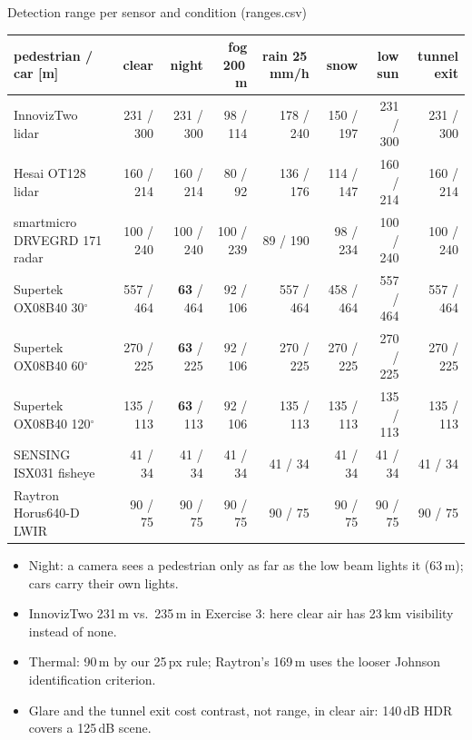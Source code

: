 \documentclass[aspectratio=169,11pt]{beamer}
\begin{document}
\begin{frame}{Detection range per sensor and condition (ranges.csv)}
  \centering\scriptsize
  \renewcommand{\arraystretch}{1.15}
  \setlength{\tabcolsep}{2.5pt}
  \begin{tabular}{@{}lrrrrrrr@{}}
    \toprule
    pedestrian / car [m] & clear & night & fog 200\,m & rain 25\,mm/h & snow & low sun & tunnel exit \\
    \midrule
    InnovizTwo lidar & 231 / 300 & 231 / 300 & 98 / 114 & 178 / 240 & 150 / 197 & 231 / 300 & 231 / 300 \\
    Hesai OT128 lidar & 160 / 214 & 160 / 214 & 80 / 92 & 136 / 176 & 114 / 147 & 160 / 214 & 160 / 214 \\
    smartmicro DRVEGRD 171 radar & 100 / 240 & 100 / 240 & 100 / 239 & 89 / 190 & 98 / 234 & 100 / 240 & 100 / 240 \\
    Supertek OX08B40 30$^\circ$ & 557 / 464 & \textbf{63} / 464 & 92 / 106 & 557 / 464 & 458 / 464 & 557 / 464 & 557 / 464 \\
    Supertek OX08B40 60$^\circ$ & 270 / 225 & \textbf{63} / 225 & 92 / 106 & 270 / 225 & 270 / 225 & 270 / 225 & 270 / 225 \\
    Supertek OX08B40 120$^\circ$ & 135 / 113 & \textbf{63} / 113 & 92 / 106 & 135 / 113 & 135 / 113 & 135 / 113 & 135 / 113 \\
    SENSING ISX031 fisheye & 41 / 34 & 41 / 34 & 41 / 34 & 41 / 34 & 41 / 34 & 41 / 34 & 41 / 34 \\
    Raytron Horus640-D LWIR & 90 / 75 & 90 / 75 & 90 / 75 & 90 / 75 & 90 / 75 & 90 / 75 & 90 / 75 \\
    \bottomrule
  \end{tabular}

  \vspace{0.6em}
  \raggedright
  \begin{itemize}
    \item Night: a camera sees a pedestrian only as far as the low beam lights it (63\,m); cars carry their own lights.
    \item InnovizTwo 231\,m vs.\ 235\,m in Exercise 3: here clear air has 23\,km visibility instead of none.
    \item Thermal: 90\,m by our 25\,px rule; Raytron's 169\,m uses the looser Johnson identification criterion.
    \item Glare and the tunnel exit cost contrast, not range, in clear air: 140\,dB HDR covers a 125\,dB scene.
  \end{itemize}
\end{frame}
\end{document}
